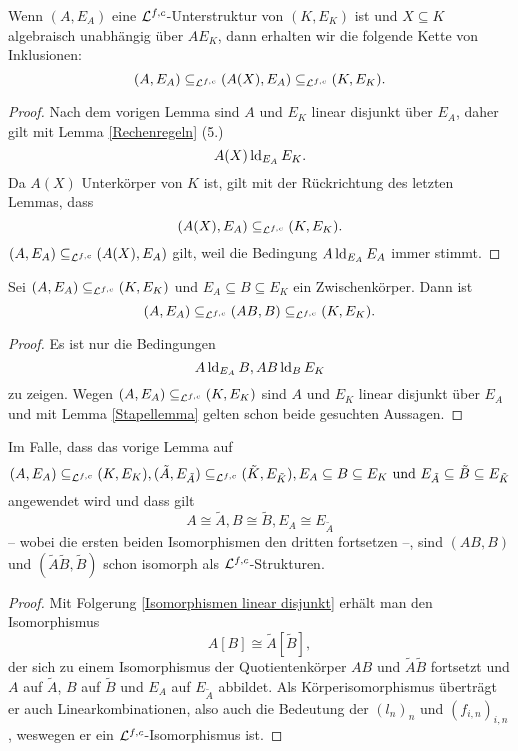     \begin{lemma}\label{transz Erw}
    	Wenn $(A,E_A)$ eine $\mathcal{L}^{f,c}$-Unterstruktur von $(K,E_K)$ ist und $X\subseteq K$ algebraisch unabhängig über $AE_K$, dann erhalten wir die folgende Kette von Inklusionen: $$(A,E_A)\subseteq_{\mathcal{L}^{f,c}}(A(X),E_A)\subseteq_{\mathcal{L}^{f,c}}(K,E_K).$$
    \end{lemma}
    \begin{proof}
    	Nach dem vorigen Lemma sind $A$ und $E_K$ linear disjunkt über $E_A$, daher gilt mit Lemma \ref{Rechenregeln} (5.) $$A(X)\operatorname{ld}_{E_A}E_K.$$ Da $A(X)$ Unterkörper von $K$ ist, gilt mit der Rückrichtung des letzten Lemmas, dass $$(A(X),E_A)\subseteq_{\mathcal{L}^{f,c}}(K,E_K).$$
    	$(A,E_A)\subseteq_{\mathcal{L}^{f,c}}(A(X),E_A)$ gilt, weil die Bedingung $A\operatorname{ld}_{E_A} E_A$ immer stimmt.
    \end{proof}
    
    \begin{lemma}\label{E-Erw}
    	Sei $(A,E_A)\subseteq_{\mathcal{L}^{f,c}}(K,E_K)$ und $E_A\subseteq B\subseteq E_K$ ein Zwischenkörper. Dann ist $$(A,E_A)\subseteq_{\mathcal{L}^{f,c}}(AB,B)\subseteq_{\mathcal{L}^{f,c}}(K,E_K).$$
    \end{lemma}
    \begin{proof}
    	Es ist nur die Bedingungen $$A\operatorname{ld}_{E_A}B,AB\operatorname{ld}_BE_K$$ zu zeigen. Wegen $(A,E_A)\subseteq_{\mathcal{L}^{f,c}}(K,E_K)$ sind $A$ und $E_K$ linear disjunkt über $E_A$ und mit Lemma \ref{Stapellemma} gelten schon beide gesuchten Aussagen.
    \end{proof}
    \newpage
    \begin{lemma}\label{Fortsetzungslemma}
    	Im Falle, dass das vorige Lemma auf $$(A,E_A)\subseteq_{\mathcal{L}^{f,c}}(K,E_K),(\tilde{A},E_{\tilde{A}})\subseteq_{\mathcal{L}^{f,c}}(\tilde{K},E_{\tilde{K}}),E_A\subseteq B\subseteq E_K\text{ und }E_{\tilde{A}}\subseteq \tilde{B}\subseteq E_{\tilde{K}}$$ angewendet wird und dass gilt $$A\cong \tilde{A},B\cong \tilde{B},E_A\cong E_{\tilde{A}}$$ \--- wobei die ersten beiden Isomorphismen den dritten fortsetzen \---, sind $(AB,B)$ und $(\tilde{A}\tilde{B},\tilde{B})$ schon isomorph als $\mathcal{L}^{f,c}$-Strukturen.
    \end{lemma}
    \begin{proof}
    	Mit Folgerung \ref{Isomorphismen linear disjunkt} erhält man den Isomorphismus $$A[B]\cong\tilde{A}[\tilde{B}],$$ der sich zu einem Isomorphismus der Quotientenkörper $AB$ und $\tilde{A}\tilde{B}$ fortsetzt und $A$ auf $\tilde{A}$, $B$ auf $\tilde{B}$ und $E_A$ auf $E_{\tilde{A}}$ abbildet. Als Körperisomorphismus überträgt er auch Linearkombinationen, also auch die Bedeutung der $(l_n)_n$ und $(f_{i,n})_{i,n}$, weswegen er ein $\mathcal{L}^{f,c}$-Isomorphismus ist.
    \end{proof}
    
